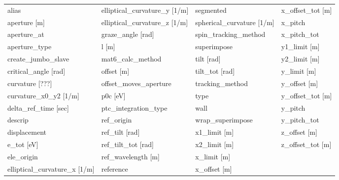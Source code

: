  \begin{tabular}{llll} \toprule
alias                            & elliptical_curvature_y [1/m]     & segmented                        & x_offset_tot [m]                 \\
aperture [m]                     & elliptical_curvature_z [1/m]     & spherical_curvature [1/m]        & x_pitch                          \\
aperture_at                      & graze_angle [rad]                & spin_tracking_method             & x_pitch_tot                      \\
aperture_type                    & l [m]                            & superimpose                      & y1_limit [m]                     \\
create_jumbo_slave               & mat6_calc_method                 & tilt [rad]                       & y2_limit [m]                     \\
critical_angle [rad]             & offset [m]                       & tilt_tot [rad]                   & y_limit [m]                      \\
curvature [???]                  & offset_moves_aperture            & tracking_method                  & y_offset [m]                     \\
curvature_x0_y2 [1/m]            & p0c [eV]                         & type                             & y_offset_tot [m]                 \\
delta_ref_time [sec]             & ptc_integration_type             & wall                             & y_pitch                          \\
descrip                          & ref_origin                       & wrap_superimpose                 & y_pitch_tot                      \\
displacement                     & ref_tilt [rad]                   & x1_limit [m]                     & z_offset [m]                     \\
e_tot [eV]                       & ref_tilt_tot [rad]               & x2_limit [m]                     & z_offset_tot [m]                 \\
ele_origin                       & ref_wavelength [m]               & x_limit [m]                      &                                  \\
elliptical_curvature_x [1/m]     & reference                        & x_offset [m]                     &                                  \\
 \bottomrule
 \end{tabular}
 \vfill
 
